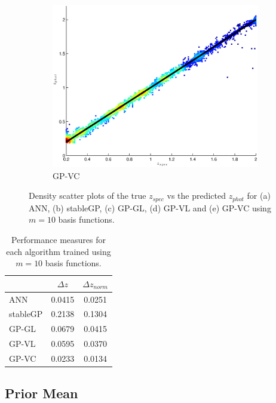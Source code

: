 \documentclass[useAMS,usenatbib,fleqn]{mn2e}
\begin{document}
\begin{figure}
\begin{subfigure}[b]{0.175\textwidth}
                \includegraphics[width=\textwidth]{figures/GPVC.eps}
                \caption{GP-VC}
        \end{subfigure}
        
        \caption{Density scatter plots of the true $z_{spec}$ vs the predicted $z_{phot}$ for (a) ANN, (b) stableGP, (c) GP-GL, (d) GP-VL and (e) GP-VC using $m=10$ basis functions.}
        \label{fig-experiment-1}
\end{figure}

 \begin{table}
\caption{Performance measures for each algorithm trained using $m=10$ basis functions.}
\begin{center}
  \begin{tabular}{| l | c | c | }
     				&	$\Delta z$	&	$\Delta z_{norm}$	\\	\hline
	ANN		&	0.0415		&	0.0251				\\
	stableGP	&	0.2138		&	0.1304				\\
	GP-GL		&	0.0679		&	0.0415				\\
	GP-VL		&	0.0595		&	0.0370				\\
	GP-VC		&	0.0233		&	0.0134				\\	\hline
  \end{tabular}
  \label{table-experiment-1}
\end{center}
\end{table}

\subsection{Prior Mean}
\end{document}
